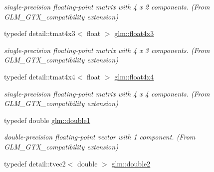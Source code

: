 \begin{DoxyCompactItemize}
\begin{DoxyCompactList}\small\item\em single-\/precision floating-\/point matrix with 4 x 2 components. (From G\+L\+M\+\_\+\+G\+T\+X\+\_\+compatibility extension) \end{DoxyCompactList}\item 
\hypertarget{group__gtx__compatibility_ga0d1ef9180a6f96bb567080ae028268fb}{}typedef detail\+::tmat4x3$<$ float $>$ \hyperlink{group__gtx__compatibility_ga0d1ef9180a6f96bb567080ae028268fb}{glm\+::float4x3}\label{group__gtx__compatibility_ga0d1ef9180a6f96bb567080ae028268fb}

\begin{DoxyCompactList}\small\item\em single-\/precision floating-\/point matrix with 4 x 3 components. (From G\+L\+M\+\_\+\+G\+T\+X\+\_\+compatibility extension) \end{DoxyCompactList}\item 
\hypertarget{group__gtx__compatibility_gaacfcd6503d726788afff75800689c87a}{}typedef detail\+::tmat4x4$<$ float $>$ \hyperlink{group__gtx__compatibility_gaacfcd6503d726788afff75800689c87a}{glm\+::float4x4}\label{group__gtx__compatibility_gaacfcd6503d726788afff75800689c87a}

\begin{DoxyCompactList}\small\item\em single-\/precision floating-\/point matrix with 4 x 4 components. (From G\+L\+M\+\_\+\+G\+T\+X\+\_\+compatibility extension) \end{DoxyCompactList}\item 
\hypertarget{group__gtx__compatibility_gab8b88350212cea916857cb2f49b8a29f}{}typedef double \hyperlink{group__gtx__compatibility_gab8b88350212cea916857cb2f49b8a29f}{glm\+::double1}\label{group__gtx__compatibility_gab8b88350212cea916857cb2f49b8a29f}

\begin{DoxyCompactList}\small\item\em double-\/precision floating-\/point vector with 1 component. (From G\+L\+M\+\_\+\+G\+T\+X\+\_\+compatibility extension) \end{DoxyCompactList}\item 
\hypertarget{group__gtx__compatibility_ga8def1da9925f47db049966afd3516572}{}typedef detail\+::tvec2$<$ double $>$ \hyperlink{group__gtx__compatibility_ga8def1da9925f47db049966afd3516572}{glm\+::double2}\label{group__gtx__compatibility_ga8def1da9925f47db049966afd3516572}


\end{DoxyCompactItemize}
